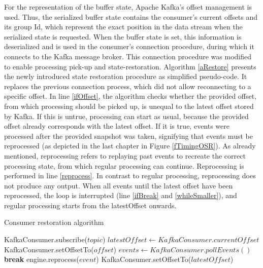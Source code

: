 For the representation of the buffer state, Apache Kafka's offset management is used. Thus, the serialized buffer state contains the consumer's current offsets and its group Id, which represent the exact position in the data stream when the serialized state is requested. When the buffer state is set, this information is deserialized and is used in the consumer's connection procedure, during which it connects to the Kafka message broker. This connection procedure was modified to enable processing pick-up and state-restoration. Algorithm \ref{aRestore} presents the newly introduced state restoration procedure as simplified pseudo-code. It replaces the previous connection process, which did not allow reconnecting to a specific offset. In line \ref{ifOffset}, the algorithm checks whether the provided offset, from which processing should be picked up, is unequal to the latest offset stored by Kafka. If this is untrue, processing can start as usual, because the provided offset already corresponds with the latest offset. If it is true, events were processed after the provided snapshot was taken, signifying that events must be reprocessed (as depicted in the last chapter in Figure \ref{fTimingOSR}). As already mentioned, reprocessing refers to replaying past events to recreate the correct processing state, from which regular processing can continue. Reprocessing is performed in line \ref{reprocess}. In contrast to regular processing, reprocessing does not produce any output. When all events until the latest offset have been reprocessed, the loop is interrupted (line \ref{ifBreak} and \ref{whileSmaller}), and regular processing starts from the latestOffset onwards.\par


\begin{algorithm}[H]
\caption{Consumer restoration algorithm}\label{aRestore}
\begin{algorithmic}[1]
\State KafkaConsumer.subscribe($topic$)
\State $latestOffset \gets KafkaConsumer.currentOffset$
\label{ifOffset}
    \State KafkaConsumer.setOffsetTo($offset$)
    \label{whileSmaller}
        \State $events \gets KafkaConsumer.pollEvents()$
            \label{ifBreak}
                \State \textbf{break}
            \EndIf
            \State engine.reprocess($event$)\label{reprocess}
        \EndFor
    \EndWhile\label{restoreendwhile}
    \State KafkaConsumer.setOffsetTo($latestOffset$)
\EndIf\label{restoreendif}
\EndProcedure
\end{algorithmic}
\end{algorithm}






